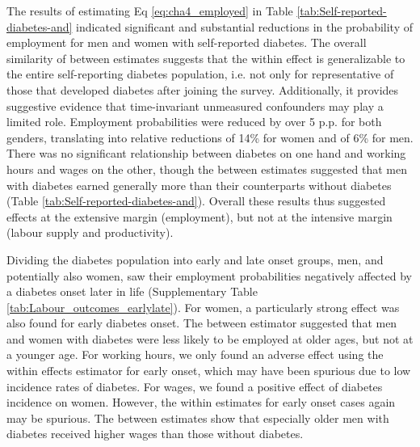 \documentclass[12pt,english]{article}
\begin{document}
The results of estimating Eq \ref{eq:cha4_employed} in Table \ref{tab:Self-reported-diabetes-and} indicated significant and substantial reductions in the probability of employment for men and women with self-reported diabetes. The overall similarity of between estimates suggests that the within effect is generalizable to the entire self-reporting diabetes population, i.e. not only for representative of those that developed diabetes after joining the survey. Additionally, it provides suggestive evidence that time-invariant unmeasured confounders may play a limited role. Employment probabilities were reduced by over 5 \ac{p.p.} for both genders, translating into relative reductions of 14\% for women and of 6\% for men. There was no significant relationship between diabetes on one hand and working hours and wages on the other, though the between estimates suggested that men with diabetes earned generally more than their counterparts without diabetes (Table \ref{tab:Self-reported-diabetes-and}). Overall these results thus suggested effects at the extensive margin (employment), but not at the intensive margin (labour supply and productivity). 

Dividing the diabetes population into early and late onset groups, men, and potentially also women, saw their employment probabilities negatively affected by a diabetes onset later in life (Supplementary Table \ref{tab:Labour_outcomes_earlylate}). For women, a particularly strong effect was also found for early diabetes onset. The between estimator suggested that men and women with diabetes were less likely to be employed at older ages, but not at a younger age. For working hours, we only found an adverse effect using the within effects estimator for early onset, which may have been spurious due to low incidence rates of diabetes. For wages, we found a positive effect of diabetes incidence on women. However, the within estimates for early onset cases again may be spurious. The between estimates show that especially older men with diabetes received higher wages than those without diabetes. 
\end{document}
